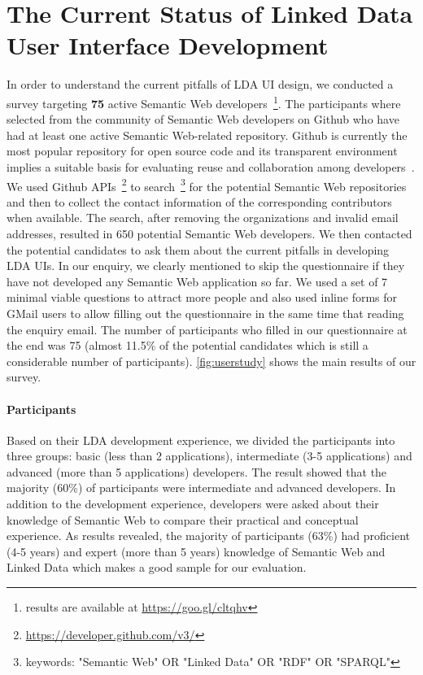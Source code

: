 \documentclass{acm_proc_article-sp}
\begin{document}
\section{The Current Status of Linked Data User Interface Development}
In order to understand the current pitfalls of LDA UI design, we conducted a survey targeting \textbf{75} active Semantic Web developers~\footnote{results are available at \url{https://goo.gl/cltqhv}}.
The participants where selected from the community of Semantic Web developers on Github who have had at least one active Semantic Web-related repository.
Github is currently the most popular repository for open source code and its transparent environment implies a suitable basis for evaluating reuse and collaboration among developers~\cite{Lima14,Tsay2014}.
We used Github APIs~\footnote{\url{https://developer.github.com/v3/}} to search~\footnote{keywords: "Semantic Web" OR "Linked Data" OR "RDF" OR "SPARQL"} for the potential Semantic Web repositories and then to collect the contact information of the corresponding contributors when available.
The search, after removing the organizations and invalid email addresses, resulted in 650 potential Semantic Web developers.
We then contacted the potential candidates to ask them about the current pitfalls in developing LDA UIs.
In our enquiry, we clearly mentioned to skip the questionnaire if they have not developed any Semantic Web application so far.
We used a set of 7 minimal viable questions to attract more people and also used inline forms for GMail users to allow filling out the questionnaire in the same time that reading the enquiry email.
The number of participants who filled in our questionnaire at the end was 75 (almost 11.5\% of the potential candidates which is still a considerable number of participants).
\autoref{fig:userstudy} shows the main results of our survey.

\paragraph{Participants}
Based on their LDA development experience, we divided the participants into three groups: basic (less than 2 applications), intermediate (3-5 applications) and advanced (more than 5 applications) developers.
The result showed that the majority (60\%) of participants were intermediate and advanced developers.
In addition to the development experience, developers were asked about their knowledge of Semantic Web to compare their practical and conceptual experience.
As results revealed, the majority of participants (63\%) had proficient (4-5 years) and expert (more than 5 years) knowledge of Semantic Web and Linked Data which makes a good sample for our evaluation. 
\end{document}
